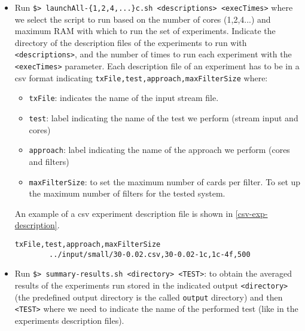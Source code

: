 \begin{itemize}
    \item Run \texttt{\$> launchAll-\{1,2,4,...\}c.sh <descriptions> <execTimes>} where we select the script to run based on the number of cores (1,2,4...) and maximum RAM with which to run the set of experiments. Indicate the directory of the description files of the experiments to run with \texttt{<descriptions>}, and the number of times to run each experiment with the \texttt{<execTimes>} parameter.
    Each description file of an experiment has to be in a csv format indicating \texttt{txFile,test,approach,maxFilterSize} where:
    \begin{itemize}
        \item \texttt{txFile}: indicates the name of the input stream file.
        \item \texttt{test}: label indicating the name of the test we perform (stream input and cores)
        \item \texttt{approach}: label indicating the name of the approach we perform (cores and filters)
        \item \texttt{maxFilterSize}: to set the maximum number of cards per filter. To set up the maximum number of filters for the tested system.
    \end{itemize}
    An example of a csv experiment description file is shown in \ref{csv-exp-description}.
    \begin{center}
    \lstset{style=cypherStyle}
    \begin{lstlisting}[caption={30-0.02-1c-4f}, label={csv-exp-description}]
        txFile,test,approach,maxFilterSize
        ../input/small/30-0.02.csv,30-0.02-1c,1c-4f,500
    \end{lstlisting}
    \end{center}
    \item Run \texttt{\$> summary-results.sh <directory> <TEST>}: to obtain the averaged results of the experiments run stored in the indicated output \texttt{<directory>} (the predefined output directory is the called \texttt{output} directory) and then \texttt{<TEST>} where we need to indicate the name of the performed test (like in the experiments description files).
\end{itemize}

